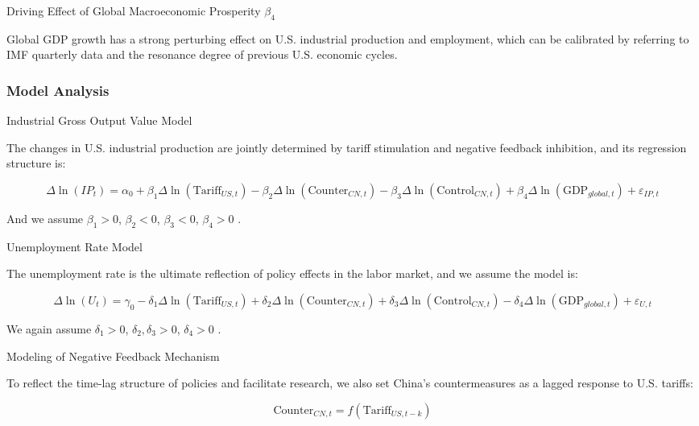 \documentclass{apmcmthesis}
\begin{document}
\item[Driving Effect of Global Macroeconomic Prosperity $\beta_4$]

Global GDP growth has a strong perturbing effect on U.S. industrial production and employment, which can be calibrated by referring to IMF quarterly data and the resonance degree of previous U.S. economic cycles.

\subsubsection{Model Analysis}

\item[Industrial Gross Output Value Model]

The changes in U.S. industrial production are jointly determined by tariff stimulation and negative feedback inhibition, and its regression structure is:

\begin{equation}
\Delta \ln(IP_t) = \alpha_0 + 
\beta_1 \Delta \ln(\text{Tariff}_{US,t})
- \beta_2 \Delta \ln(\text{Counter}_{CN,t})
- \beta_3 \Delta \ln(\text{Control}_{CN,t})
+ \beta_4 \Delta \ln(\text{GDP}_{global,t})
+ \varepsilon_{IP,t}
\end{equation}

And we assume $\beta_1>0$, $\beta_2<0$, $\beta_3<0$, $\beta_4>0$ .

\item[Unemployment Rate Model]

The unemployment rate is the ultimate reflection of policy effects in the labor market, and we assume the model is:

\begin{equation}
\Delta \ln(U_t) = \gamma_0 
- \delta_1 \Delta \ln(\text{Tariff}_{US,t})
+ \delta_2 \Delta \ln(\text{Counter}_{CN,t})
+ \delta_3 \Delta \ln(\text{Control}_{CN,t})
- \delta_4 \Delta \ln(\text{GDP}_{global,t})
+ \varepsilon_{U,t}
\end{equation}

We again assume $\delta_1>0$, $\delta_2,\delta_3>0$, $\delta_4>0$ .

\item[Modeling of Negative Feedback Mechanism]

To reflect the time-lag structure of policies and facilitate research, we also set China's countermeasures as a lagged response to U.S. tariffs:

\begin{equation}
\text{Counter}_{CN,t} = f(\text{Tariff}_{US,t-k})
\end{equation}
\end{document}
